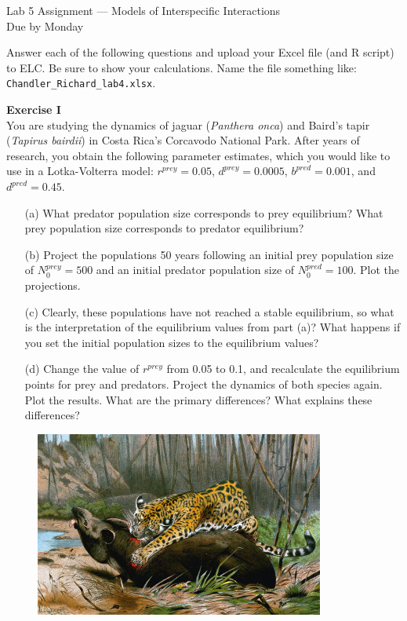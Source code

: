 \documentclass[12pt]{article}\usepackage[]{graphicx}\usepackage[]{color}
\begin{document}
{
  \Large
  \centering
  Lab 5 Assignment --- Models of Interspecific Interactions \\
  Due by Monday \par
}

Answer each of the following questions and upload your Excel file (and
R script) to ELC. Be sure to show your calculations. Name the 
file something like: \texttt{Chandler\_Richard\_lab4.xlsx}. \\



\vspace{6pt}

{\bf Exercise I \\}
You are studying the dynamics of jaguar (\textit{Panthera onca}) and Baird's
tapir (\textit{Tapirus bairdii}) in Costa Rica's Corcavodo National Park. After
years of research, you obtain the following parameter estimates, which
you would like to use in a Lotka-Volterra model: $r^{prey}=0.05$,
$d^{prey}=0.0005$, $b^{pred}=0.001$, and $d^{pred}=0.45$.  
\begin{enumerate}
  \item[(a)] What predator population size corresponds to prey equilibrium?
    What prey population size corresponds to predator equilibrium? 
  \item[(b)] Project the populations 50 years following an initial prey
    population size of $N_0^{prey}=500$ and an initial predator
    population size of $N_0^{pred}=100$. Plot the projections.  
  \item[(c)] Clearly, these populations have not reached a stable
    equilibrium, so what is the interpretation of the equilibrium
    values from part (a)? What happens if you set the initial
    population sizes to the equilibrium values?  
  \item[(d)] Change the value of $r^{prey}$ from 0.05 to 0.1,
    and recalculate the equilibrium points for prey and
    predators. Project the dynamics of both species again. Plot the
    results. What are the primary differences?  What explains these
    differences? 
\end{enumerate}

\vspace{12pt}

\begin{figure}[h!]
  \centering
  \includegraphics[width=0.85\textwidth]{jaguar_killing_tapir}
  \label{fig:jag-tapir}
\end{figure}
\end{document}
